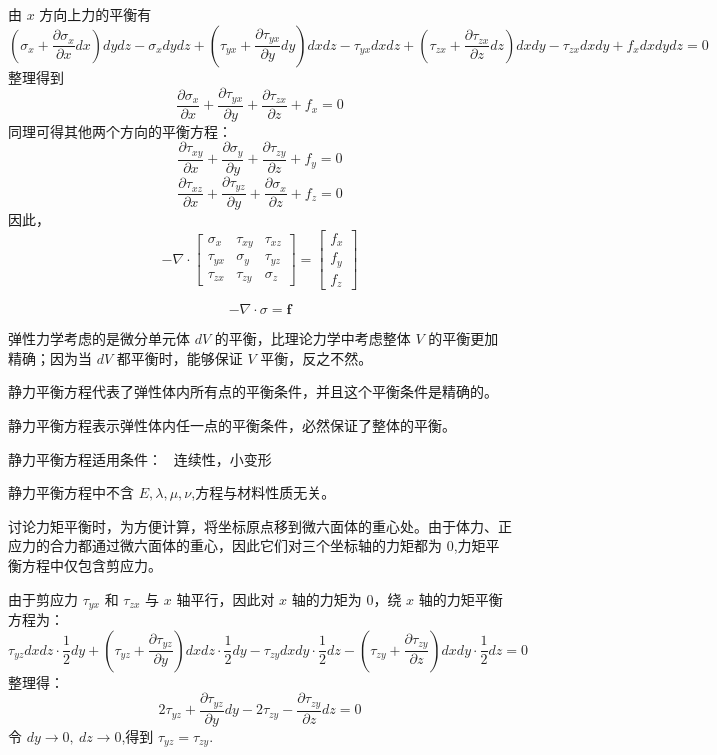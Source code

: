 \documentclass[12pt,a4paper]{article}
\begin{document}
由 $x$ 方向上力的平衡有
$$
(\sigma_x+\frac{\partial\sigma_x}{\partial x}dx)dydz-\sigma_x dydz+(\tau_{yx}+\frac{\partial\tau_{yx}}{\partial y}dy)dxdz-\tau_{yx}dxdz+(\tau_{zx}+\frac{\partial\tau_{zx}}{\partial z}dz)dxdy-\tau_{zx}dxdy+f_xdxdydz=0
$$
整理得到
$$
\frac{\partial\sigma_x}{\partial x}+\frac{\partial\tau_{yx}}{\partial y}+\frac{\partial\tau_{zx}}{\partial z}+f_x=0
$$
同理可得其他两个方向的平衡方程：
$$
\frac{\partial\tau_{xy}}{\partial x}+\frac{\partial\sigma_{y}}{\partial y}+\frac{\partial\tau_{zy}}{\partial z}+f_y=0
$$
$$
\frac{\partial\tau_{xz}}{\partial x}+\frac{\partial\tau_{yz}}{\partial y}+\frac{\partial\sigma_{x}}{\partial z}+f_z=0
$$
因此，
$$
-\nabla\cdot\begin{bmatrix}
\sigma _x & \tau_{xy} & \tau_{xz} \\
\tau_{yx} & \sigma _y & \tau_{yz} \\
\tau_{zx} & \tau_{zy} & \sigma _z
\end{bmatrix}=\begin{bmatrix}
f_x \\
f_y \\
f_z
\end{bmatrix}
$$

$$
-\nabla\cdot \sigma = \textbf{f}
$$

弹性力学考虑的是微分单元体 $dV$ 的平衡，比理论力学中考虑整体 $V$ 的平衡更加精确；因为当 $dV$ 都平衡时，能够保证 $V$ 平衡，反之不然。

静力平衡方程代表了弹性体内所有点的平衡条件，并且这个平衡条件是精确的。

静力平衡方程表示弹性体内任一点的平衡条件，必然保证了整体的平衡。

静力平衡方程适用条件：~ 连续性，小变形

静力平衡方程中不含 $E,\lambda , \mu , \nu$,方程与材料性质无关。

讨论力矩平衡时，为方便计算，将坐标原点移到微六面体的重心处。由于体力、正应力的合力都通过微六面体的重心，因此它们对三个坐标轴的力矩都为 $0$,力矩平衡方程中仅包含剪应力。

由于剪应力 $\tau_{yx}$ 和 $\tau_{zx}$ 与 $x$ 轴平行，因此对 $x$ 轴的力矩为 $0$，绕 $x$ 轴的力矩平衡方程为：
$$
\tau_{yz}dxdz\cdot\frac{1}{2}dy+(\tau_{yz}+\frac{\partial\tau_{yz}}{\partial y})dxdz\cdot\frac{1}{2}dy-\tau_{zy}dxdy\cdot\frac{1}{2}dz-(\tau_{zy}+\frac{\partial\tau_{zy}}{\partial z})dxdy\cdot\frac{1}{2}dz=0
$$
整理得：
$$
2\tau_{yz}+\frac{\partial\tau_{yz}}{\partial y}dy-2\tau_{zy}-\frac{\partial\tau_{zy}}{\partial z}dz=0
$$
令 $dy\longrightarrow 0,~ dz\longrightarrow 0$,得到 $\tau_{yz}=\tau_{zy}$.
\end{document}
